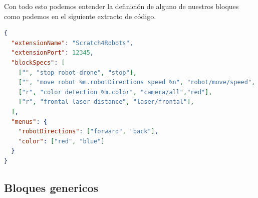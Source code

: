 Con todo esto podemos entender la definición de alguno de nuestros bloques como podemos en el siguiente extracto de código.
\begin{nobreak} 
\begin{lstlisting}[language=json,firstnumber=1]
{
  "extensionName": "Scratch4Robots",
  "extensionPort": 12345, 
  "blockSpecs": [
    ["", "stop robot-drone", "stop"],         
    ["", "move robot %m.robotDirections speed %n", "robot/move/speed", "forward", 1],
    ["r", "color detection %m.color", "camera/all","red"],
    ["r", "frontal laser distance", "laser/frontal"],
  ],
  "menus": {
    "robotDirections": ["forward", "back"],         
    "color": ["red", "blue"]
  }
}

\end{lstlisting}
\end{nobreak} 

\subsection{Bloques genericos}

